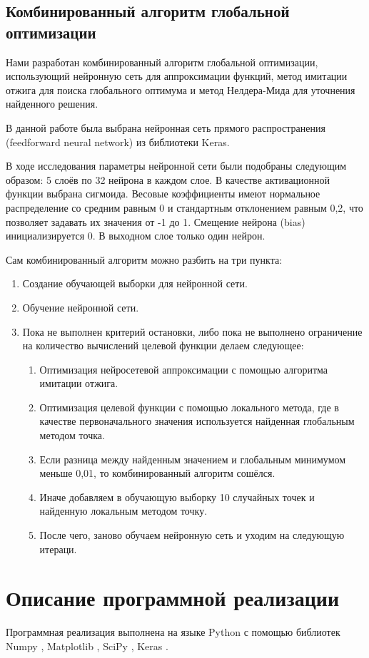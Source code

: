 \documentclass[11pt, oneside, a4paper]{article}
\begin{document}
\subsection{Комбинированный алгоритм глобальной оптимизации}
Нами разработан комбинированный алгоритм глобальной оптимизации, использующий нейронную сеть для аппроксимации функций, метод имитации отжига для поиска глобального оптимума и метод Нелдера-Мида для уточнения найденного решения. 

В данной работе была выбрана нейронная сеть прямого распространения (feedforward neural network)\cite{fio_bib2,fio_bib3,fio_bib4,fio_bib5,fio_bib6,fio_bib7} из библиотеки Keras\cite{fio_bib15}. 

В ходе исследования параметры нейронной сети были подобраны следующим образом: 5 слоёв по 32 нейрона в каждом слое. В качестве активационной функции выбрана сигмоида. Весовые коэффициенты имеют нормальное распределение со средним равным 0 и стандартным отклонением равным 0,2, что позволяет задавать их значения от -1 до 1. Смещение нейрона (bias) инициализируется 0. В выходном слое только один нейрон. 

Сам комбинированный алгоритм можно разбить на три пункта:
\begin{enumerate}
\item Создание обучающей выборки для нейронной сети.
\item Обучение нейронной сети.
\item Пока не выполнен критерий остановки, либо пока не выполнено ограничение на количество вычислений целевой функции делаем следующее:
\begin{enumerate}
\item Оптимизация нейросетевой аппроксимации с помощью алгоритма имитации отжига.
\item Оптимизация целевой функции с помощью локального метода, где в качестве первоначального значения используется найденная глобальным методом точка.
\item Если разница между найденным значением и глобальным минимумом меньше 0,01, то комбинированный алгоритм сошёлся.
\item Иначе добавляем в обучающую выборку 10 случайных точек и найденную локальным методом точку.
\item После чего, заново обучаем нейронную сеть и уходим на следующую итераци.
\end{enumerate}
\end{enumerate}
\section{Описание программной реализации}
Программная реализация выполнена на языке Python с помощью библиотек Numpy \cite{fio_bib12}, Matplotlib \cite{fio_bib13}, SciPy \cite{fio_bib14}, Keras \cite{fio_bib15}. 	
\end{document}
